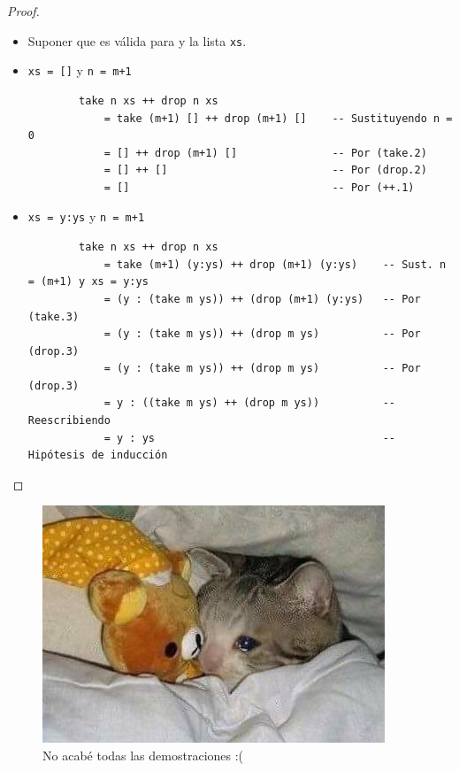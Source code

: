 \documentclass[11pt,letterpaper]{article}
\begin{document}
\begin{enumerate}
\begin{proof}
\begin{itemize}
    \item Suponer que es válida para  y la lista \texttt{xs}.
    
    \item \texttt{xs = []} y \texttt{n = m+1}
    \begin{verbatim}
        take n xs ++ drop n xs
            = take (m+1) [] ++ drop (m+1) []    -- Sustituyendo n = 0
            = [] ++ drop (m+1) []               -- Por (take.2)
            = [] ++ []                          -- Por (drop.2)
            = []                                -- Por (++.1)

    \end{verbatim}

    \item \texttt{xs = y:ys} y \texttt{n = m+1}
    \begin{verbatim}
        take n xs ++ drop n xs
            = take (m+1) (y:ys) ++ drop (m+1) (y:ys)    -- Sust. n = (m+1) y xs = y:ys
            = (y : (take m ys)) ++ (drop (m+1) (y:ys)   -- Por (take.3)
            = (y : (take m ys)) ++ (drop m ys)          -- Por (drop.3)
            = (y : (take m ys)) ++ (drop m ys)          -- Por (drop.3)
            = y : ((take m ys) ++ (drop m ys))          -- Reescribiendo
            = y : ys                                    -- Hipótesis de inducción
    \end{verbatim}

\end{itemize}
\end{proof}







\begin{figure}[H]
    \centering
    \includegraphics[scale=0.5]{gato.jpeg}
    \caption{No acabé todas las demostraciones :(}
\end{figure}


\end{enumerate}
\end{document}

